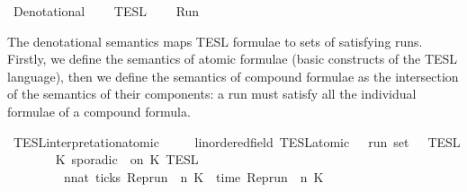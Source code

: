 %
\begin{isabellebody}%
%
%
\isadelimdocument
%
\endisadelimdocument
%
\isatagdocument
%
\isamarkuptrue%
%
\endisatagdocument
{\isafolddocument}%
%
\isadelimdocument
%
\endisadelimdocument
%
\isadelimtheory
%
\endisadelimtheory
%
\isatagtheory
{}\isamarkupfalse%
\ Denotational\isanewline
{}\isanewline
\ \ \ \ TESL\isanewline
\ \ \ \ Run\isanewline
\isanewline
{}%
\endisatagtheory
{\isafoldtheory}%
%
\isadelimtheory
%
\endisadelimtheory
%
\begin{isamarkuptext}%
The denotational semantics maps TESL formulae to sets of satisfying runs.
  Firstly, we define the semantics of atomic formulae (basic constructs of the 
  TESL language), then we define the semantics of compound formulae as the
  intersection of the semantics of their components: a run must satisfy all
  the individual formulae of a compound formula.%
\end{isamarkuptext}\isamarkuptrue%
%
\isadelimdocument
%
\endisadelimdocument
%
\isatagdocument
%
\isamarkuptrue%
%
\endisatagdocument
{\isafolddocument}%
%
\isadelimdocument
%
\endisadelimdocument
\isanewline
{}\isamarkupfalse%
\ TESL{\isacharunderscore}interpretation{\isacharunderscore}atomic\isanewline
\ \ \ \ {\isacharcolon}{\isacharcolon}\ {\isacartoucheopen}{\isacharparenleft}{\isacharprime}{\isasymtau}{\isacharcolon}{\isacharcolon}linordered{\isacharunderscore}field{\isacharparenright}\ TESL{\isacharunderscore}atomic\ {\isasymRightarrow}\ {\isacharprime}{\isasymtau}\ run\ set{\isacartoucheclose}\ {\isacharparenleft}{\isacartoucheopen}{\isasymlbrakk}\ {\isacharunderscore}\ {\isasymrbrakk}\isactrlsub T\isactrlsub E\isactrlsub S\isactrlsub L{\isacartoucheclose}{\isacharparenright}\isanewline
{}\isanewline
\ \ %
\isanewline
\ \ \ \ {\isacartoucheopen}{\isasymlbrakk}\ K\ sporadic\ {\isasymtau}\ on\ K\ {\isasymrbrakk}\isactrlsub T\isactrlsub E\isactrlsub S\isactrlsub L\ {\isacharequal}\isanewline
\ \ \ \ \ \ \ \ {\isacharbraceleft}{\isasymrho}{\isachardot}\ {\isasymexists}n{\isacharcolon}{\isacharcolon}nat{\isachardot}\ ticks\ {\isacharparenleft}{\isacharparenleft}Rep{\isacharunderscore}run\ {\isasymrho}{\isacharparenright}\ n\ K\ {\isasymand}\ time\ {\isacharparenleft}{\isacharparenleft}Rep{\isacharunderscore}run\ {\isasymrho}{\isacharparenright}\ n\ K\ {\isacharequal}\ {\isasymtau}{\isacharbraceright}{\isacartoucheclose}\isanewline

\end{isabellebody}
